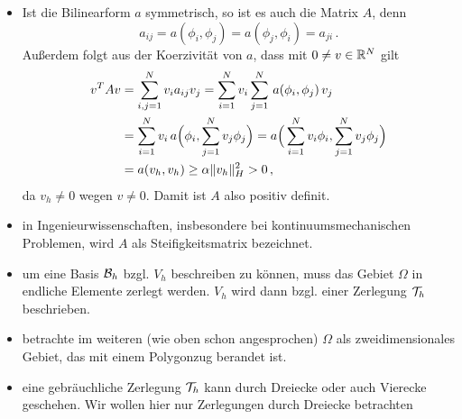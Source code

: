 \begin{itemize}
\item \begin{bem}\label{bem:2.17}
Ist die Bilinearform $a$ symmetrisch, so ist es auch die Matrix $A$, denn
\[
	a_{ij} = a(\phi_i,\phi_j) = a(\phi_j,\phi_i)= a_{ji} \, .
\]
Außerdem folgt aus der Koerzivität von $a$, dass  mit $0 \not = v \in \mathbb{R}^N$ gilt
\begin{align*}
	v^T A v & = \sum_{i,j=1}^N v_i a_{ij} v_j  =  \sum_{i=1}^N v_i\sum_{j=1}^N \, a(\phi_i,\phi_j) \, v_j   \\
	& = \sum_{i=1}^N v_i \, a\Big(\phi_i,\sum_{j=1}^Nv_j\phi_j\Big) =  a\Big(\sum_{i=1}^N v_i\phi_i,\sum_{j=1}^Nv_j\phi_j\Big) \\
	& = a(v_h,v_h) \ge \alpha \lVert v_h\rVert^2_H > 0 \, ,
\end{align*}
da $v_h \not = 0$ wegen $v \not = 0$. Damit ist $A$ also positiv definit.
\end{bem}

\item in Ingenieurwissenschaften, insbesondere bei kontinuumsmechanischen Problemen, wird $A$ als Steifigkeitsmatrix bezeichnet.

\item um eine Basis $\mathcal B_h$ bzgl. $V_h$ beschreiben zu können, muss das Gebiet $\Omega$ in endliche Elemente zerlegt werden. $V_h$ wird dann bzgl. einer Zerlegung $\mathcal T_h$ beschrieben.

\item betrachte im weiteren (wie oben schon angesprochen) $\Omega$ als zweidimensionales Gebiet, das mit einem Polygonzug berandet ist.

\item eine gebräuchliche Zerlegung $\mathcal T_h$ kann durch Dreiecke oder auch Vierecke geschehen. Wir wollen hier nur Zerlegungen durch Dreiecke betrachten


\end{itemize}
